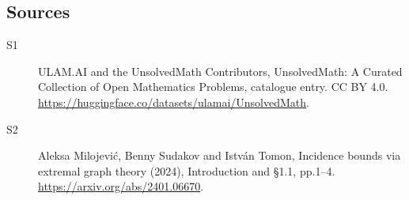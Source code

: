 \documentclass[11pt]{article}
\begin{document}
\subsection{Sources}
\begin{description}
\item[\hypertarget{source:statement:1}{S1}] ULAM.AI and the UnsolvedMath Contributors, UnsolvedMath: A Curated Collection of Open Mathematics Problems, catalogue entry. CC BY 4.0. \url{https://huggingface.co/datasets/ulamai/UnsolvedMath}.
\item[\hypertarget{source:statement:2}{S2}] Aleksa Milojević, Benny Sudakov and István Tomon, Incidence bounds via extremal graph theory (2024), Introduction and §1.1, pp.1–4. \url{https://arxiv.org/abs/2401.06670}.
\end{description}
\label{end:statement}
\end{document}
